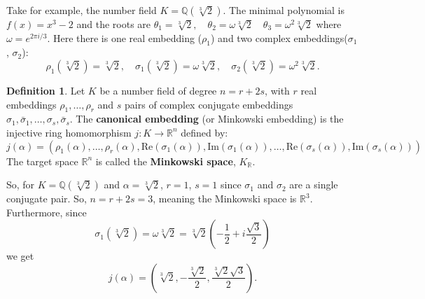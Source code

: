 \documentclass[12pt]{article}
\theoremstyle{definition}
\newtheorem{definition}[theorem]{Definition}
\begin{document}
Take for example, the number field $K = \mathbb{Q}(\sqrt[3]{2})$. The minimal polynomial is $f(x) = x^3 -2$ and the roots are
$\theta_1 = \sqrt[3]{2}, \quad \theta_2 = \omega\sqrt[3]{2} \quad \theta_3 = \omega^2\sqrt[3]{2}$ where $\omega = e^{2\pi i/3}$. Here there is one
real embedding ($\rho_1$) and two complex embeddings($\sigma_1$, $\sigma_2$):
\[ \rho_1(\sqrt[3]{2}) = \sqrt[3]{2}, \quad \sigma_1(\sqrt[3]{2}) = \omega \sqrt[3]{2}, \quad \sigma_2(\sqrt[3]{2}) = \omega^2 \sqrt[3]{2}.\]
\begin{definition}
    Let $K$ be a number field of degree $n = r + 2s$, with $r$ real embeddings $\rho_1, \dots, \rho_r$ and $s$ pairs of complex conjugate embeddings $\sigma_1, \bar{\sigma}_1, \dots, \sigma_s, \bar{\sigma}_s$. The \textbf{canonical embedding} (or Minkowski embedding) is the injective ring homomorphism $j: K \to \mathbb{R}^n$ defined by:
    \[ j(\alpha) = (\rho_1(\alpha), \dots, \rho_r(\alpha), \text{Re}(\sigma_1(\alpha)), \text{Im}(\sigma_1(\alpha)), \dots, \text{Re}(\sigma_s(\alpha)), \text{Im}(\sigma_s(\alpha))) \]
    The target space $\mathbb{R}^n$ is called the \textbf{Minkowski space}, $K_\mathbb{R}$.
\end{definition}
So, for $K = \mathbb{Q}(\sqrt[3]{2})$ and $\alpha = \sqrt[3]{2}$, $r = 1$, $s=1$ since $\sigma_1$ and $\sigma_2$ are a single conjugate pair. So,
$n=r+2s = 3$, meaning the Minkowski space is $\mathbb{R}^3$. Furthermore, since 
\[\sigma_1(\sqrt[3]{2}) = \omega \sqrt[3]{2} = \sqrt[3]{2}(-\frac{1}{2} + i\frac{\sqrt{3}}{2})\]
we get
\[j(\alpha) = (\sqrt[3]{2}, -\frac{\sqrt[3]{2}}{2}, \frac{\sqrt[3]{2}\sqrt{3}}{2}).\]
\end{document}
